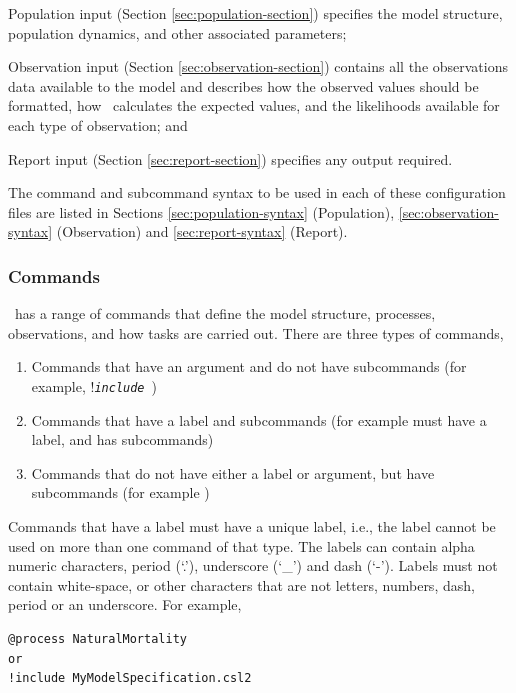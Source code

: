 \begin{description}

\item Population input (Section \ref{sec:population-section}) specifies the model structure, population dynamics, and other associated parameters;
\item Observation input (Section \ref{sec:observation-section}) contains all the observations data available to the model and  describes how the observed values should be formatted, how \IBM\ calculates the expected values, and the likelihoods available for each type of observation; and
\item Report input (Section \ref{sec:report-section}) specifies any output required.
\end{description}

The command and subcommand syntax to be used in each of these configuration files are listed in Sections \ref{sec:population-syntax} (Population), \ref{sec:observation-syntax} (Observation) and \ref{sec:report-syntax} (Report).

\subsubsection{Commands}

\IBM\ has a range of commands that define the model structure, processes, observations, and how tasks are carried out. There are three types of commands, 

\begin{enumerate}
\item Commands that have an argument and do not have subcommands (for example, !\texttt{\emph{include}}\ )
\item Commands that have a label and subcommands (for example  must have a label, and has subcommands)
\item Commands that do not have either a label or argument, but have subcommands (for example )
\end{enumerate}

Commands that have a label must have a unique label, i.e., the label cannot be used on more than one command of that type. The labels can contain alpha numeric characters, period (`.'), underscore (`\_') and dash (`-'). Labels must not contain white-space, or other characters that are not letters, numbers, dash, period or an underscore. For example,

{\small{\begin{verbatim}
@process NaturalMortality
or
!include MyModelSpecification.csl2
		\end{verbatim}}}

